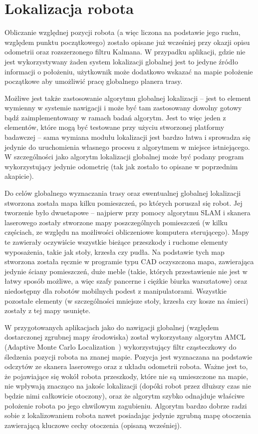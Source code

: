 \section{Lokalizacja robota}

Obliczanie względnej pozycji robota (a więc liczona na podstawie jego ruchu, względem
punktu początkowego) zostało opisane już wcześniej przy okazji opisu odometrii
oraz rozszerzonego filtru Kalmana. W przypadku aplikacji, gdzie nie jest wykorzystywany
żaden system lokalizacji globalnej jest to jedyne źródło informacji o położeniu,
użytkownik może dodatkowo wskazać na mapie położenie początkowe aby umożliwić pracę
globalnego planera trasy.

Możliwe jest także zastosowanie algorytmu globalnej lokalizacji -- jest to element
wymienny w systemie nawigacji i może być tam zastosowany dowolny gotowy bądź zaimplementowany
w ramach badań algorytm. Jest to więc jeden z elementów, które mogą być testowane
przy użyciu stworzonej platformy badawczej -- sama wymiana modułu lokalizacji jest
bardzo łatwa i sprowadza się jedynie do uruchomienia własnego procesu z algorytmem
w miejsce istniejącego. W szczególności jako algorytm lokalizacji globalnej może być
podany program wykorzystujący jedynie odometrię (tak jak zostało to opisane w poprzednim
akapicie).

Do celów globalnego wyznaczania trasy oraz ewentualnej globalnej lokalizacji stworzona
została mapa kilku pomieszczeń, po których poruszał się robot. Jej tworzenie było
dwuetapowe -- najpierw przy pomocy algorytmu SLAM i skanera laserowego zostały
stworzone mapy poszczególnych pomieszczeń (w kilku częściach, ze względu na możliwości
obliczeniowe komputera sterującego). Mapy te zawierały oczywiście wszystkie bieżące
przeszkody i ruchome elementy wyposażenia, takie jak stoły, krzesła czy pudła.
Na podstawie tych map stworzona została ręcznie w programie typu CAD oczyszczona
mapa, zawierająca jedynie ściany pomieszczeń, duże meble (takie, których przestawienie
nie jest w łatwy sposób możliwe, a więc szafy pancerne i ciężkie biurka warsztatowe)
oraz niedostępny dla robotów mobilnych podest z manipulatorami. Wszystkie pozostałe
elementy (w szczególności mniejsze stoły, krzesła czy kosze na śmieci) zostały z tej
mapy usunięte.

W przygotowanych aplikacjach jako do nawigacji globalnej (względem dostarczonej
zgrubnej mapy środowiska) został wykorzystany algorytm AMCL (Adaptive Monte Carlo
Localization~\cite{fox2001kld}) wykorzystujący filtr cząsteczkowy do śledzenia
pozycji robota na znanej mapie. Pozycja jest wyznaczana na podstawie odczytów
ze skanera laserowego oraz z układu odometrii robota. Ważne jest to, że pojawiające
się wokół robota przeszkody, które nie są umieszczone na mapie, nie wpływają znacząco
na jakośc lokalizacji (dopóki robot przez dłuższy czas nie będzie nimi całkowicie
otoczony), oraz że algorytm szybko odnajduje właściwe położenie robota po jego
chwilowym zagubieniu. Algorytm bardzo dobrze radzi sobie z lokalizowaniem robota nawet
posiadając jedynie zgrubną mapę otoczenia zawierającą kluczowe cechy otoczenia
(opisaną wcześniej).

